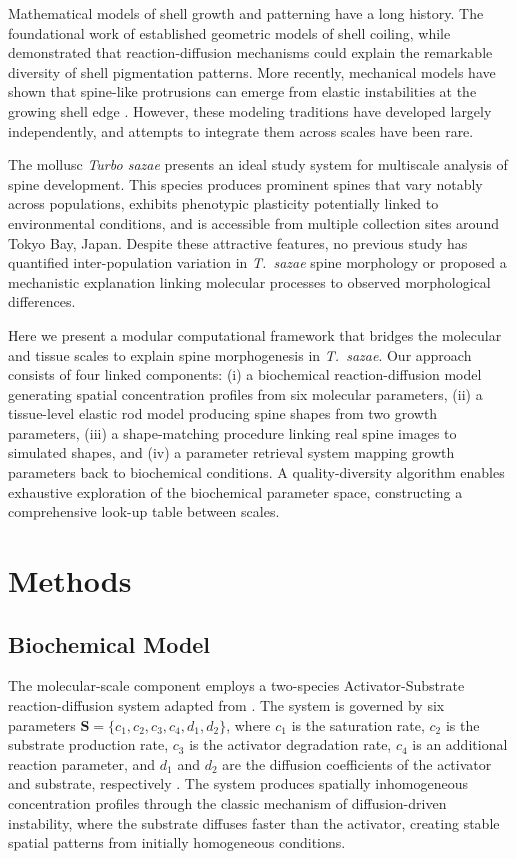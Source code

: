 \documentclass[11pt]{article}
\begin{document}
Mathematical models of shell growth and patterning have a long history. The foundational work of \citet{raup1966} established geometric models of shell coiling, while \citet{meinhardt2009} demonstrated that reaction-diffusion mechanisms could explain the remarkable diversity of shell pigmentation patterns. More recently, mechanical models have shown that spine-like protrusions can emerge from elastic instabilities at the growing shell edge \citep{chirat2013,moulin2019}. However, these modeling traditions have developed largely independently, and attempts to integrate them across scales have been rare.

The mollusc \textit{Turbo sazae} \citep{sasaki2017} presents an ideal study system for multiscale analysis of spine development. This species produces prominent spines that vary notably across populations, exhibits phenotypic plasticity potentially linked to environmental conditions, and is accessible from multiple collection sites around Tokyo Bay, Japan. Despite these attractive features, no previous study has quantified inter-population variation in \textit{T.\ sazae} spine morphology or proposed a mechanistic explanation linking molecular processes to observed morphological differences.

Here we present a modular computational framework that bridges the molecular and tissue scales to explain spine morphogenesis in \textit{T.\ sazae}. Our approach consists of four linked components: (i) a biochemical reaction-diffusion model generating spatial concentration profiles from six molecular parameters, (ii) a tissue-level elastic rod model producing spine shapes from two growth parameters, (iii) a shape-matching procedure linking real spine images to simulated shapes, and (iv) a parameter retrieval system mapping growth parameters back to biochemical conditions. A quality-diversity algorithm \citep{mouret2015} enables exhaustive exploration of the biochemical parameter space, constructing a comprehensive look-up table between scales.

\section{Methods}

\subsection{Biochemical Model}

The molecular-scale component employs a two-species Activator-Substrate reaction-diffusion system adapted from \citet{fowler2004}. The system is governed by six parameters $\mathbf{S} = \{c_1, c_2, c_3, c_4, d_1, d_2\}$, where $c_1$ is the saturation rate, $c_2$ is the substrate production rate, $c_3$ is the activator degradation rate, $c_4$ is an additional reaction parameter, and $d_1$ and $d_2$ are the diffusion coefficients of the activator and substrate, respectively \citep{turing1952,kondo2010,murray2003}. The system produces spatially inhomogeneous concentration profiles through the classic mechanism of diffusion-driven instability, where the substrate diffuses faster than the activator, creating stable spatial patterns from initially homogeneous conditions.
\end{document}
